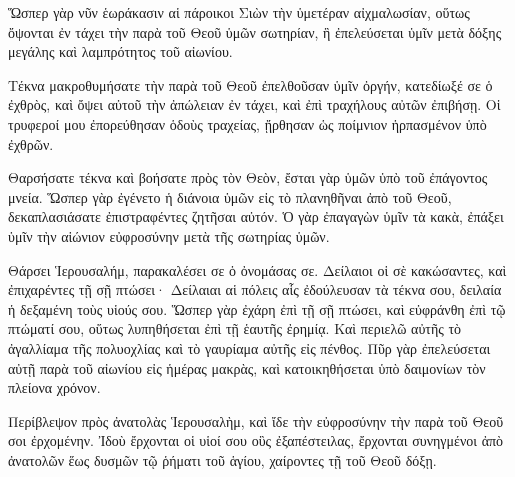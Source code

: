 {Ὥσπερ γὰρ νῦν ἑωράκασιν αἱ πάροικοι Σιὼν τὴν ὑμετέραν αἰχμαλωσίαν, οὕτως ὄψονται ἐν τάχει τὴν παρὰ τοῦ Θεοῦ ὑμῶν σωτηρίαν, ἣ ἐπελεύσεται ὑμῖν μετὰ δόξης μεγάλης καὶ λαμπρότητος τοῦ αἰωνίου.
\par }{\PP {}Τέκνα μακροθυμήσατε τὴν παρὰ τοῦ Θεοῦ ἐπελθοῦσαν ὑμῖν ὀργήν, κατεδίωξέ σε ὁ ἐχθρὸς, καὶ ὄψει αὐτοῦ τὴν ἀπώλειαν ἐν τάχει, καὶ ἐπὶ τραχήλους αὐτῶν ἐπιβήσῃ.
Οἱ τρυφεροί μου ἐπορεύθησαν ὁδοὺς τραχείας, ᾔρθησαν ὡς ποίμνιον ἡρπασμένον ὑπὸ ἐχθρῶν.
\par }{\PP {}Θαρσήσατε τέκνα καὶ βοήσατε πρὸς τὸν Θεὸν, ἔσται γὰρ ὑμῶν ὑπὸ τοῦ ἐπάγοντος μνεία.
Ὥσπερ γὰρ ἐγένετο ἡ διάνοια ὑμῶν εἰς τὸ πλανηθῆναι ἀπὸ τοῦ Θεοῦ, δεκαπλασιάσατε ἐπιστραφέντες ζητῆσαι αὐτόν.
Ὁ γὰρ ἐπαγαγὼν ὑμῖν τὰ κακὰ, ἐπάξει ὑμῖν τὴν αἱώνιον εὐφροσύνην μετὰ τῆς σωτηρίας ὑμῶν.
\par }{\PP {}Θάρσει Ἱερουσαλήμ, παρακαλέσει σε ὁ ὀνομάσας σε.
Δείλαιοι οἱ σὲ κακώσαντες, καὶ ἐπιχαρέντες τῇ σῇ πτώσει·
Δείλαιαι αἱ πόλεις αἷς ἐδούλευσαν τὰ τέκνα σου, δειλαία ἡ δεξαμένη τοὺς υἱούς σου.
Ὥσπερ γὰρ ἐχάρη ἐπὶ τῇ σῇ πτώσει, καὶ εὐφράνθη ἐπὶ τῷ πτώματί σου, οὕτως λυπηθήσεται ἐπὶ τῇ ἑαυτῆς ἐρημίᾳ.
Καὶ περιελῶ αὐτῆς τὸ ἀγαλλίαμα τῆς πολυοχλίας καὶ τὸ γαυρίαμα αὐτῆς εἰς πένθος.
Πῦρ γὰρ ἐπελεύσεται αὐτῇ παρὰ τοῦ αἰωνίου εἰς ἡμέρας μακρὰς, καὶ κατοικηθήσεται ὑπὸ δαιμονίων τὸν πλείονα χρόνον.
\par }{\PP {}Περίβλεψον πρὸς ἀνατολὰς Ἱερουσαλὴμ, καὶ ἴδε τὴν εὐφροσύνην τὴν παρὰ τοῦ Θεοῦ σοι ἐρχομένην.
Ἰδοὺ ἔρχονται οἱ υἱοί σου οὓς ἐξαπέστειλας, ἔρχονται συνηγμένοι ἀπὸ ἀνατολῶν ἕως δυσμῶν τῷ ῥήματι τοῦ ἁγίου, χαίροντες τῇ τοῦ Θεοῦ δόξῃ.

\par }